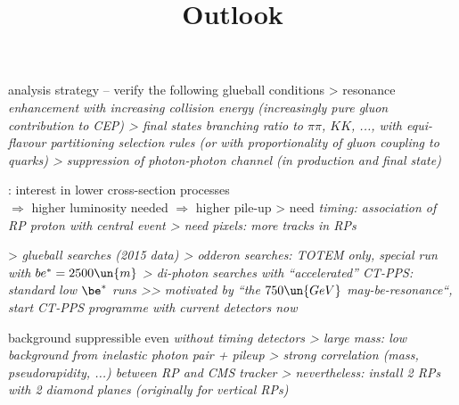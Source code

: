 \centerline{}

\> analysis strategy -- verify the following glueball conditions
\>> resonance \em{enhancement with increasing collision} energy (increasingly pure gluon contribution to CEP)
\>> final states \em{branching ratio to $\pi\pi$, $KK$, ...},  with equi-flavour partitioning selection rules (or with proportionality of
gluon coupling to quarks)
\>> \em{suppression of photon-photon} channel (in production and final state)



\newpage %
\title{Outlook}

\> : interest in lower cross-section processes\\ $\Rightarrow$ higher luminosity needed $\Rightarrow$ higher pile-up
\>> need \em{timing}: association of RP proton with central event
\>> need \em{pixels}: more tracks in RPs

\cThird
\centerline{%
%
}



\> 
\>> \em{glueball} searches (2015 data)
\>> \em{odderon} searches: TOTEM only, special run with $be^* = 2500\un{m}$
\>> \em{di-photon} searches with ``accelerated'' CT-PPS: standard low $\be^*$ runs
\>>> motivated by ``the $750\un{GeV}$ may-be-resonance``, start CT-PPS programme with current detectors now


\newpage %


\> background suppressible even \em{without timing} detectors
\>> large mass: low background from inelastic photon pair + pileup
\>> strong correlation (mass, pseudorapidity, ...) between RP and CMS tracker
\>> nevertheless: install 2 RPs with 2 diamond planes (originally for vertical RPs)

